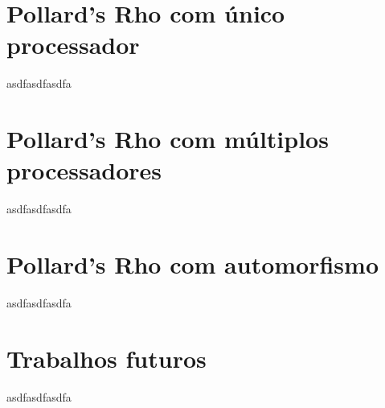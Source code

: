 \documentclass{beamer}
\begin{document}
\section{Pollard's Rho com único processador}
\begin{frame}
asdfasdfasdfa
\end{frame}

\section{Pollard's Rho com múltiplos processadores}
\begin{frame}
asdfasdfasdfa
\end{frame}

\section{Pollard's Rho com automorfismo}
\begin{frame}
asdfasdfasdfa
\end{frame}

\section{Trabalhos futuros}
\begin{frame}
asdfasdfasdfa
\end{frame}
\end{document}
